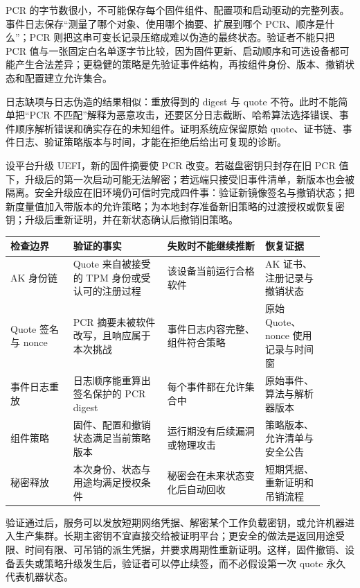 PCR 的字节数很小，不可能保存每个固件组件、配置项和启动驱动的完整列表。事件日志保存“测量了哪个对象、使用哪个摘要、扩展到哪个 PCR、顺序是什么”；PCR 则把这串可变长记录压缩成难以伪造的最终状态。验证者不能只把 PCR 值与一张固定白名单逐字节比较，因为固件更新、启动顺序和可选设备都可能产生合法差异；更稳健的策略是先验证事件结构，再按组件身份、版本、撤销状态和配置建立允许集合。

日志缺项与日志伪造的结果相似：重放得到的 digest 与 quote 不符。此时不能简单把“PCR 不匹配”解释为恶意攻击，还要区分日志截断、哈希算法选择错误、事件顺序解析错误和确实存在的未知组件。证明系统应保留原始 quote、证书链、事件日志、验证策略版本与时间，才能在拒绝后给出可复现的诊断。


设平台升级 UEFI，新的固件摘要使 PCR 改变。若磁盘密钥只封存在旧 PCR 值下，升级后的第一次启动可能无法解密；若远端只接受旧事件清单，新版本也会被隔离。安全升级应在旧环境仍可信时完成四件事：验证新镜像签名与撤销状态；把新度量值加入带版本的允许策略；为本地封存准备新旧策略的过渡授权或恢复密钥；升级后重新证明，并在新状态确认后撤销旧策略。

\begin{longtable}{L{0.18\linewidth}L{0.27\linewidth}L{0.28\linewidth}L{0.17\linewidth}}
\toprule
检查边界 & 验证的事实 & 失败时不能继续推断 & 恢复证据 \\
\midrule
AK 身份链 & Quote 来自被接受的 TPM 身份或受认可的注册过程 & 该设备当前运行合格软件 & AK 证书、注册记录与撤销状态 \\\tablerowrule
Quote 签名与 nonce & PCR 摘要未被软件改写，且响应属于本次挑战 & 事件日志内容完整、组件符合策略 & 原始 Quote、nonce 使用记录与时间窗 \\\tablerowrule
事件日志重放 & 日志顺序能重算出签名保护的 PCR digest & 每个事件都在允许集合中 & 原始事件、算法与解析器版本 \\\tablerowrule
组件策略 & 固件、配置和撤销状态满足当前策略版本 & 运行期没有后续漏洞或物理攻击 & 策略版本、允许清单与安全公告 \\\tablerowrule
秘密释放 & 本次身份、状态与用途均满足授权条件 & 秘密会在未来状态变化后自动回收 & 短期凭据、重新证明和吊销流程 \\
\bottomrule
\end{longtable}


验证通过后，服务可以发放短期网络凭据、解密某个工作负载密钥，或允许机器进入生产集群。长期主密钥不宜直接交给被证明平台；更安全的做法是返回用途受限、时间有限、可吊销的派生凭据，并要求周期性重新证明。这样，固件撤销、设备丢失或策略升级发生后，验证者可以停止续签，而不必假设第一次 quote 永久代表机器状态。

